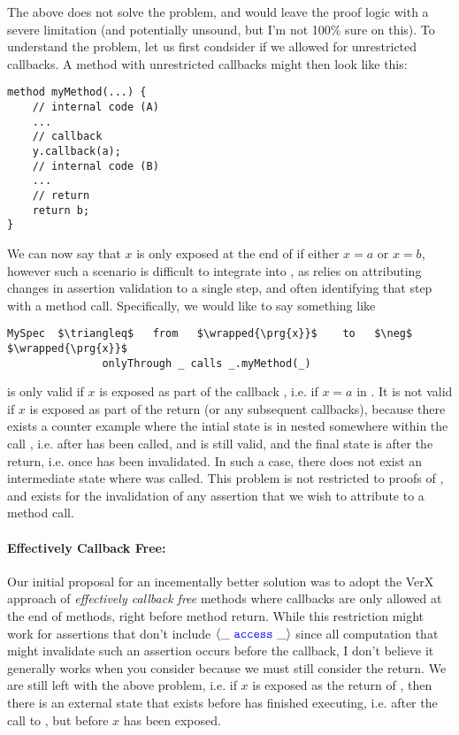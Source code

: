 \documentclass[11pt]{article} %
\begin{document}
The above does not solve the problem, and would leave the 
proof logic with a severe limitation (and potentially unsound, but I'm
not 100\% sure on this).
To understand the problem, let us first condsider if we allowed for 
unrestricted callbacks. A method with unrestricted callbacks might then
look like this:
\begin{lstlisting}[language = Chainmail, mathescape=true, frame=lines]
method myMethod(...) {
	// internal code (A)
	...
	// callback
	y.callback(a);
	// internal code (B)
	...
	// return
	return b;
}
\end{lstlisting}
We can now say that $x$ is only exposed at the end of  
if either $x = a$ or $x = b$, however such a scenario is difficult to integrate into
\Nec, as \Nec relies on attributing changes in assertion validation to a single step,
and often identifying that step with a method call. Specifically, we would like to
say something like
\begin{lstlisting}[language = Chainmail, mathescape=true, frame=lines]
   MySpec  $\triangleq$   from   $\wrapped{\prg{x}}$    to   $\neg$ $\wrapped{\prg{x}}$
               onlyThrough _ calls _.myMethod(_)
\end{lstlisting}
 is only valid if $x$ is exposed as part of the callback ,
i.e. if $x = a$ in . It is not valid if
$x$ is exposed as part of the return (or any subsequent callbacks), because 
there exists a counter example where the intial state is in nested somewhere
within the call , i.e. after  has been
called, and  is still valid, and the final state is after the return,
i.e. once  has been invalidated. In such a case, there does not exist
an intermediate state where  was called. This problem is not 
restricted to proofs of , and exists for the invalidation 
of any assertion that we wish to attribute to a method call.

\paragraph{Effectively Callback Free:}
Our initial proposal for an incementally better solution was to adopt the VerX 
approach of \emph{effectively callback free} methods where callbacks are 
only allowed at the end of methods, right before method return. While this
restriction might work for assertions that don't include $\langle \_\ {\color{blue}\texttt{access}}\ \_ \rangle$
since all computation that might invalidate such an assertion occurs before
the callback, I don't believe it generally works when you consider 
because we must still consider the return.
We are still left with the above problem, 
i.e. if $x$ is exposed as the return of , then there is an external state that exists before  has finished executing, i.e. after the call to 
, but before $x$ has been exposed.
\end{document}
